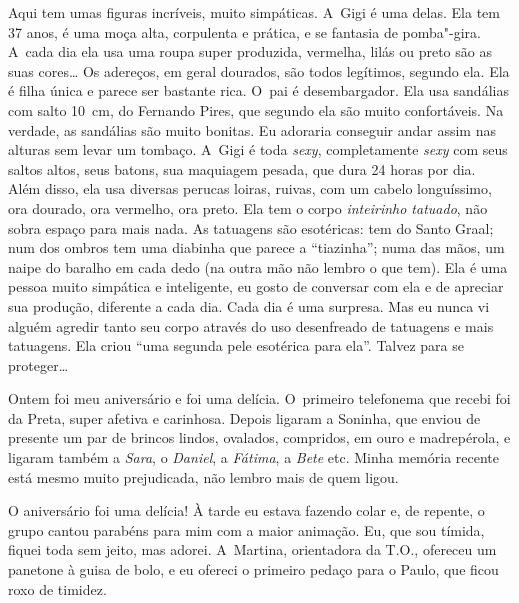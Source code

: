 Aqui tem umas figuras incríveis, muito simpáticas. A~Gigi é uma delas.
Ela tem 37 anos, é uma moça alta, corpulenta e prática, e se fantasia de
pomba"-gira. A~cada dia ela usa uma roupa super produzida, vermelha,
lilás ou preto são as suas cores… Os adereços, em geral dourados,
são todos legítimos, segundo ela. Ela é filha única e parece ser bastante
rica. O~pai é desembargador. Ela usa sandálias com salto 10\, cm, do
Fernando Pires, que segundo ela são muito confortáveis. Na verdade, as
sandálias são muito bonitas. Eu adoraria conseguir andar assim nas
alturas sem levar um tombaço. A~Gigi é toda \emph{sexy}, completamente
\emph{sexy} com seus saltos altos, seus batons, sua maquiagem pesada,
que dura 24 horas por dia. Além disso, ela usa diversas perucas loiras,
ruivas, com um cabelo longuíssimo, ora dourado, ora vermelho, ora
preto. Ela tem o corpo \emph{inteirinho tatuado}, não sobra espaço
para mais nada. As tatuagens são esotéricas: tem do Santo Graal; num dos
ombros tem uma diabinha que parece a ``tiazinha''; numa das mãos, um
naipe do baralho em cada dedo (na outra mão não lembro o que tem). Ela é
uma pessoa muito simpática e inteligente, eu gosto de conversar com ela
e de apreciar sua produção, diferente a cada dia. Cada dia é uma
surpresa. Mas eu nunca vi alguém agredir tanto seu corpo através do uso
desenfreado de tatuagens e mais tatuagens. Ela criou ``uma segunda pele
esotérica para ela''. Talvez para se proteger…

Ontem foi meu aniversário e foi uma delícia. O~primeiro telefonema que
recebi foi da Preta, super afetiva e carinhosa. Depois ligaram a
Soninha, que enviou de presente um par de brincos lindos, ovalados,
compridos, em ouro e madrepérola, e ligaram também a \emph{Sara}, o
\emph{Daniel}, a \emph{Fátima}, a \emph{Bete} etc. Minha memória recente
está mesmo muito prejudicada, não lembro mais de quem ligou.

O aniversário foi uma delícia! À tarde eu estava fazendo colar e, de
repente, o grupo cantou parabéns para mim com a maior animação. Eu, que
sou tímida, fiquei toda sem jeito, mas adorei. A~Martina, orientadora da
T.O., ofereceu um panetone à guisa de bolo, e eu ofereci o primeiro
pedaço para o Paulo, que ficou roxo de timidez.

